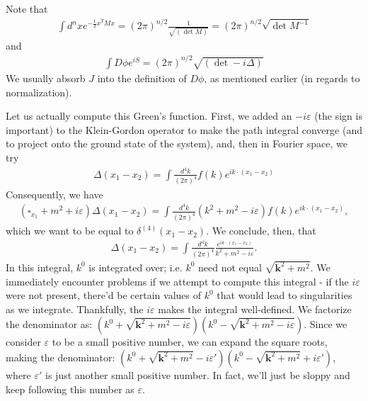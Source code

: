 \documentclass{../mathnotes}
\begin{document}
\begin{rem}
    Note that
    \begin{align*}
        \int d^nx e^{-\frac{1}{2}x^TMx}=(2\pi)^{n/2}\frac{1}{\sqrt{\left( \det M \right)}}=(2\pi)^{n/2}\sqrt{\det M^{-1}}
    \end{align*}
    and
    \begin{align*}
        \int D\phi e^{iS}=(2\pi)^{n/2} \sqrt{\left( \det -i\Delta \right)}
    \end{align*}
    We usually absorb $J$ into the definition of $D\phi$, as mentioned earlier (in regards to normalization).
\end{rem}

Let us actually compute this Green's function. First, we added an $-i\varepsilon$ (the sign is important) to the Klein-Gordon operator to
make the path integral converge (and to project onto the ground state of the system), and, then in Fourier space, we try
\begin{align*}
    \Delta(x_1-x_2)=\int \frac{d^4k}{(2\pi)^4}f(k)e^{ik\cdot (x_1-x_2)}
\end{align*}
Consequently, we have
\begin{align*}
    \left( \square_{x_1}+m^2+i\varepsilon \right)\Delta(x_1-x_2)=\int \frac{d^4k}{(2\pi)^4}(k^2+m^2-i\varepsilon)f(k)e^{ik\cdot (x_1-x_2)},
\end{align*}
which we want to be equal to $\delta^{(4)}(x_1-x_2)$. We conclude, then, that
\begin{align*}
    \Delta(x_1-x_2)=\int\frac{d^4k}{(2\pi)^4}\frac{e^{ik\cdot(x_1-x_2)}}{k^2+m^2-i\varepsilon}.
\end{align*}
In this integral, $k^0$ is integrated over; i.e. $k^0$ need not equal $\sqrt{\mathbf{k}^2+m^2}$. We immediately encounter problems if
we attempt to compute this integral - if the $i\varepsilon$ were not present, there'd be certain values of $k^0$ that would lead
to singularities as we integrate. Thankfully, the $i\varepsilon$ makes the integral well-defined. We factorize the denominator as:
$\left( k^0+\sqrt{\mathbf{k}^2+m^2-i\varepsilon} \right)\left( k^0-\sqrt{\mathbf{k}^2+m^2-i\varepsilon} \right)$. Since we consider $\varepsilon$
to be a small positive number, we can expand the square roots, making the denominator:
$\left( k^0+\sqrt{\mathbf{k}^2+m^2}-i\varepsilon' \right)\left( k^0-\sqrt{\mathbf{k}^2+m^2}+i\varepsilon' \right)$,
where $\varepsilon'$ is just another small positive number. In fact, we'll just be sloppy and keep following this number as $\varepsilon$.
\end{document}

